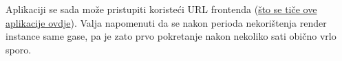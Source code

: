 			 Aplikaciji se sada može pristupiti koristeći URL frontenda (\href{ozdraviapp-fe.onrender.com}{što se tiče ove aplikacije ovdje}). Valja napomenuti da se nakon perioda nekorištenja render instance same gase, pa je zato prvo pokretanje nakon nekoliko sati obično vrlo sporo.
			
			 
			 
			
			
			\eject 